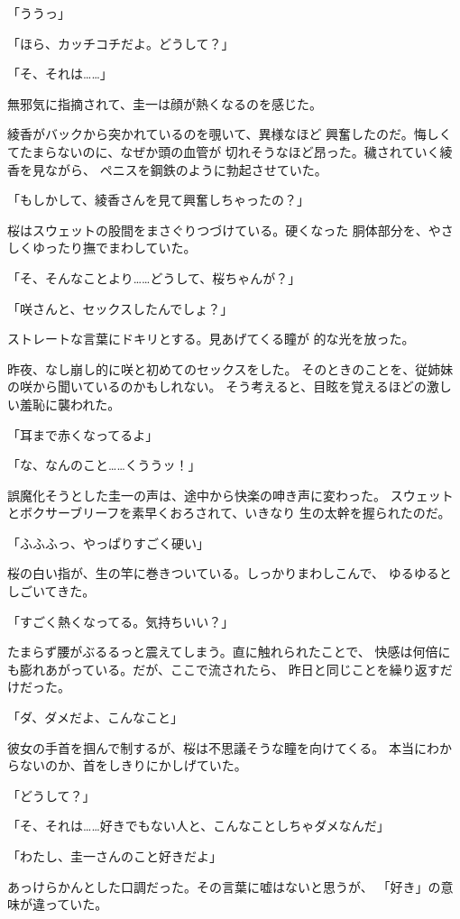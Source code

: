 ﻿\documentclass[
    book,tate,
    line_length=30zw,
    jafontsize=12pt,
    paper=b5j,
    landscape,
    ]{jlreq}
\begin{document}
「ううっ」

「ほら、カッチコチだよ。どうして？」

「そ、それは……」

無邪気に指摘されて、圭一は顔が熱くなるのを感じた。

綾香がバックから突かれているのを覗いて、異様なほど
興奮したのだ。悔しくてたまらないのに、なぜか頭の血管が
切れそうなほど昂った。穢されていく綾香を見ながら、
ペニスを鋼鉄のように勃起させていた。

「もしかして、綾香さんを見て興奮しちゃったの？」

桜はスウェットの股間をまさぐりつづけている。硬くなった
胴体部分を、やさしくゆったり撫でまわしていた。

「そ、そんなことより……どうして、桜ちゃんが？」

「咲さんと、セックスしたんでしょ？」

ストレートな言葉にドキリとする。見あげてくる瞳が
的な光を放った。

昨夜、なし崩し的に咲と初めてのセックスをした。
そのときのことを、従姉妹の咲から聞いているのかもしれない。
そう考えると、目眩を覚えるほどの激しい羞恥に襲われた。

「耳まで赤くなってるよ」

「な、なんのこと……くううッ！」

誤魔化そうとした圭一の声は、途中から快楽の呻き声に変わった。
スウェットとボクサーブリーフを素早くおろされて、いきなり
生の太幹を握られたのだ。

「ふふふっ、やっぱりすごく硬い」

桜の白い指が、生の竿に巻きついている。しっかりまわしこんで、
ゆるゆるとしごいてきた。

「すごく熱くなってる。気持ちいい？」

たまらず腰がぶるるっと震えてしまう。直に触れられたことで、
快感は何倍にも膨れあがっている。だが、ここで流されたら、
昨日と同じことを繰り返すだけだった。

「ダ、ダメだよ、こんなこと」

彼女の手首を掴んで制するが、桜は不思議そうな瞳を向けてくる。
本当にわからないのか、首をしきりにかしげていた。

「どうして？」

「そ、それは……好きでもない人と、こんなことしちゃダメなんだ」

「わたし、圭一さんのこと好きだよ」

あっけらかんとした口調だった。その言葉に嘘はないと思うが、
「好き」の意味が違っていた。
\end{document}
